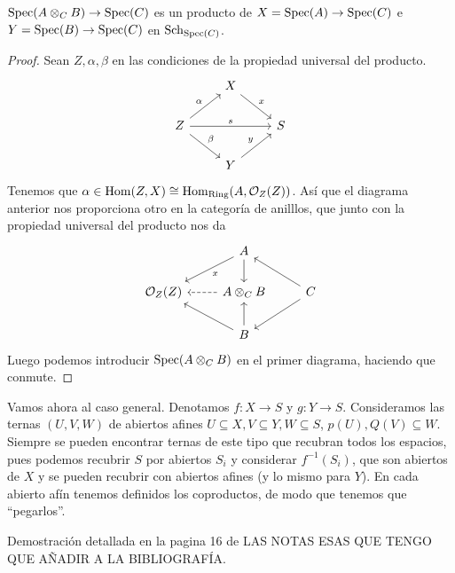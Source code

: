 \documentclass[GA.tex]{subfiles}
\begin{document}
\begin{dem}
\begin{lemma}
$\operatorname{Spec}(A\otimes_C B)\to\operatorname{Spec}(C)$ es un producto de $X=\operatorname{Spec}(A)\to\operatorname{Spec}(C)$ e $Y=\operatorname{Spec}(B)\to\operatorname{Spec}(C)$ en $\mathrm{Sch}_{\operatorname{Spec}(C)}$.
\end{lemma}
\begin{proof}
Sean $Z,\alpha,\beta$ en las condiciones de la propiedad universal del producto. 
\[
\begin{tikzcd}
& X\arrow[dr, "x"]&\\
Z\arrow[ur, "\alpha"]\arrow[rr, "s"]\arrow[dr, "\beta"] &  & S\\
& Y \arrow[ur, "y"]&
\end{tikzcd}
\]
Tenemos que $\alpha\in\operatorname{Hom}(Z,X)\cong\operatorname{Hom}_{\mathrm{Ring}}(A,{\mathcal O}_Z(Z))$. Así que el diagrama anterior nos proporciona otro en la categoría de anilllos, que junto con la propiedad universal del producto nos da
\[
\begin{tikzcd}
& A\arrow[dl, "x"]\arrow[d]&\\
\OO_Z(Z) & A\otimes_C B\arrow[l, dashed] & C\arrow[dl]\arrow[ul]\\
& B \arrow[ul]\arrow[u]&
\end{tikzcd}
\]
Luego podemos introducir $\operatorname{Spec}(A\otimes_C B)$ en el primer diagrama, haciendo que conmute. 

\end{proof}

Vamos ahora al caso general. Denotamos $f:X\to S$ y $g:Y\to S$. Consideramos las ternas $(U,V,W)$ de abiertos afines $U\subseteq X, V\subseteq Y, W\subseteq S$, $p(U),Q(V)\subseteq W$. Siempre se pueden encontrar ternas de este tipo que recubran todos los espacios, pues podemos recubrir $S$ por abiertos $S_i$ y considerar $f^{-1}(S_i)$, que son abiertos de $X$ y se pueden recubrir con abiertos afines (y lo mismo para $Y$). En cada abierto afín tenemos definidos los coproductos, de modo que tenemos que ``pegarlos''. 

Demostración detallada en la pagina 16 de LAS NOTAS ESAS QUE TENGO QUE AÑADIR A LA BIBLIOGRAFÍA. 


\end{dem}
\end{document}
